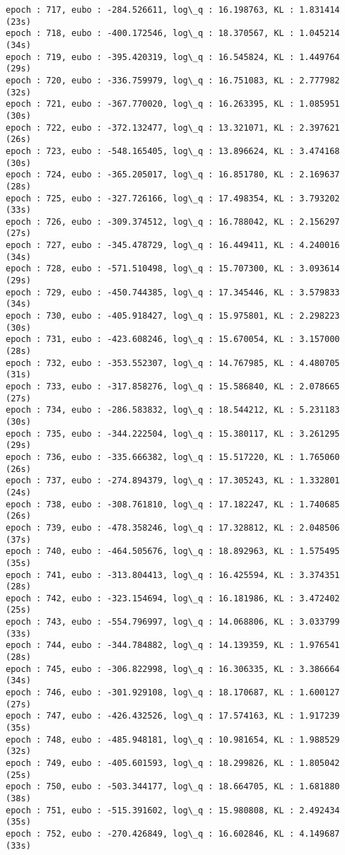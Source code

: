 \documentclass[11pt]{article}
\begin{document}
\begin{Verbatim}[commandchars=\\\{\}]
epoch : 717, eubo : -284.526611, log\_q : 16.198763, KL : 1.831414 (23s)
epoch : 718, eubo : -400.172546, log\_q : 18.370567, KL : 1.045214 (34s)
epoch : 719, eubo : -395.420319, log\_q : 16.545824, KL : 1.449764 (29s)
epoch : 720, eubo : -336.759979, log\_q : 16.751083, KL : 2.777982 (32s)
epoch : 721, eubo : -367.770020, log\_q : 16.263395, KL : 1.085951 (30s)
epoch : 722, eubo : -372.132477, log\_q : 13.321071, KL : 2.397621 (26s)
epoch : 723, eubo : -548.165405, log\_q : 13.896624, KL : 3.474168 (30s)
epoch : 724, eubo : -365.205017, log\_q : 16.851780, KL : 2.169637 (28s)
epoch : 725, eubo : -327.726166, log\_q : 17.498354, KL : 3.793202 (33s)
epoch : 726, eubo : -309.374512, log\_q : 16.788042, KL : 2.156297 (27s)
epoch : 727, eubo : -345.478729, log\_q : 16.449411, KL : 4.240016 (34s)
epoch : 728, eubo : -571.510498, log\_q : 15.707300, KL : 3.093614 (29s)
epoch : 729, eubo : -450.744385, log\_q : 17.345446, KL : 3.579833 (34s)
epoch : 730, eubo : -405.918427, log\_q : 15.975801, KL : 2.298223 (30s)
epoch : 731, eubo : -423.608246, log\_q : 15.670054, KL : 3.157000 (28s)
epoch : 732, eubo : -353.552307, log\_q : 14.767985, KL : 4.480705 (31s)
epoch : 733, eubo : -317.858276, log\_q : 15.586840, KL : 2.078665 (27s)
epoch : 734, eubo : -286.583832, log\_q : 18.544212, KL : 5.231183 (30s)
epoch : 735, eubo : -344.222504, log\_q : 15.380117, KL : 3.261295 (29s)
epoch : 736, eubo : -335.666382, log\_q : 15.517220, KL : 1.765060 (26s)
epoch : 737, eubo : -274.894379, log\_q : 17.305243, KL : 1.332801 (24s)
epoch : 738, eubo : -308.761810, log\_q : 17.182247, KL : 1.740685 (26s)
epoch : 739, eubo : -478.358246, log\_q : 17.328812, KL : 2.048506 (37s)
epoch : 740, eubo : -464.505676, log\_q : 18.892963, KL : 1.575495 (35s)
epoch : 741, eubo : -313.804413, log\_q : 16.425594, KL : 3.374351 (28s)
epoch : 742, eubo : -323.154694, log\_q : 16.181986, KL : 3.472402 (25s)
epoch : 743, eubo : -554.796997, log\_q : 14.068806, KL : 3.033799 (33s)
epoch : 744, eubo : -344.784882, log\_q : 14.139359, KL : 1.976541 (28s)
epoch : 745, eubo : -306.822998, log\_q : 16.306335, KL : 3.386664 (34s)
epoch : 746, eubo : -301.929108, log\_q : 18.170687, KL : 1.600127 (27s)
epoch : 747, eubo : -426.432526, log\_q : 17.574163, KL : 1.917239 (35s)
epoch : 748, eubo : -485.948181, log\_q : 10.981654, KL : 1.988529 (32s)
epoch : 749, eubo : -405.601593, log\_q : 18.299826, KL : 1.805042 (25s)
epoch : 750, eubo : -503.344177, log\_q : 18.664705, KL : 1.681880 (38s)
epoch : 751, eubo : -515.391602, log\_q : 15.980808, KL : 2.492434 (35s)
epoch : 752, eubo : -270.426849, log\_q : 16.602846, KL : 4.149687 (33s)

\end{Verbatim}
\end{document}
